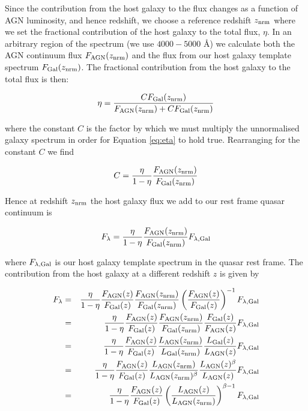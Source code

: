 Since the contribution from the host galaxy to the flux changes as a function of AGN luminosity, and hence redshift, we choose a reference redshift $z_{\rm nrm}$ where we set the fractional contribution of the host galaxy to the total flux, $\eta$. 
In an arbitrary region of the spectrum (we use $4000 - 5000$ \AA) we calculate both the AGN continuum flux $F_{\rm AGN}(z_{\rm nrm})$ and the flux from our host galaxy template spectrum $F_{\rm Gal}(z_{\rm nrm})$. 
The fractional contribution from the host galaxy to the total flux is then:

\begin{eqnarray}
  \label{eq:eta}
  \eta = \frac{CF_{\rm Gal}(z_{\rm nrm})}{F_{\rm AGN}(z_{\rm nrm}) + CF_{\rm Gal}(z_{\rm nrm})}
\end{eqnarray}

where the constant $C$ is the factor by which we must multiply the unnormalised galaxy spectrum in order for Equation \ref{eq:eta} to hold true. 
Rearranging for the constant $C$ we find

\begin{eqnarray}
  C = \frac{\eta}{1 - \eta} \frac{F_{\rm AGN}(z_{\rm nrm})}{F_{\rm Gal}(z_{\rm nrm})}
\end{eqnarray}
 
Hence at redshift $z_{\rm nrm}$ the host galaxy flux we add to our rest frame quasar continuum is 

\begin{eqnarray}
  \label{eq:flambda}
  F_{\lambda} = \frac{\eta}{1 - \eta} \frac{F_{\rm AGN}(z_{\rm nrm})}{F_{\rm Gal}(z_{\rm nrm})} F_{\lambda,{\rm Gal}}
\end{eqnarray}

where $F_{\lambda,{\rm Gal}}$ is our host galaxy template spectrum in the quasar rest frame. 
The contribution from the host galaxy at a different redshift $z$ is given by  

\begin{eqnarray}
  F_{\lambda} & = & \frac{\eta}{1 - \eta} \frac{F_{\rm AGN}(z)}{F_{\rm Gal}(z)} \frac{F_{\rm AGN}(z_{\rm nrm})}{F_{\rm Gal}(z_{\rm nrm})} \left( \frac{F_{\rm AGN}(z)}{F_{\rm Gal}(z)} \right)^{-1}  F_{\lambda,{\rm Gal}} \\ 
& = &  \frac{\eta}{1 - \eta} \frac{F_{\rm AGN}(z)}{F_{\rm Gal}(z)} \frac{F_{\rm AGN}(z_{\rm nrm})}{F_{\rm Gal}(z_{\rm nrm})}  \frac{F_{\rm Gal}(z)}{F_{\rm AGN}(z)}   F_{\lambda,{\rm Gal}} \\ & = &  \frac{\eta}{1 - \eta} \frac{F_{\rm AGN}(z)}{F_{\rm Gal}(z)} \frac{L_{\rm AGN}(z_{\rm nrm})}{L_{\rm Gal}(z_{\rm nrm})}  \frac{L_{\rm Gal}(z)}{L_{\rm AGN}(z)}  F_{\lambda,{\rm Gal}}  \\ & = & \frac{\eta}{1 - \eta} \frac{F_{\rm AGN}(z)}{F_{\rm Gal}(z)} \frac{L_{\rm AGN}(z_{\rm nrm})}{L_{\rm AGN}(z_{\rm nrm})^\beta}  \frac{L_{\rm AGN}(z)^\beta}{L_{\rm AGN}(z)}  F_{\lambda,{\rm Gal}} \\ & = &  \frac{\eta}{1 - \eta} \frac{F_{\rm AGN}(z)}{F_{\rm Gal}(z)} \left( \frac{L_{\rm AGN}(z)}{L_{\rm AGN}(z_{\rm nrm})} \right)^{\beta - 1}  F_{\lambda,{\rm Gal}}
\end{eqnarray}

